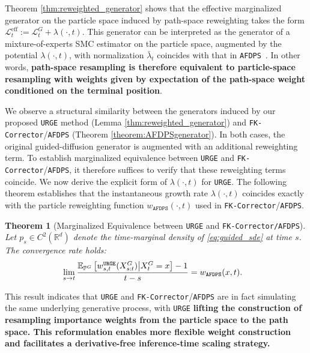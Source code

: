 \documentclass{article}
\theoremstyle{plain}
\newtheorem{theorem}{Theorem}[section]
\theoremstyle{definition}
\theoremstyle{remark}
\renewcommand{\P}{{\mathbb{P}}}
\newcommand{\R}{{\mathbb{R}}}
\begin{document}
Theorem \ref{thm:reweighted_generator} shows that the effective marginalized generator on the particle space induced by path-space reweighting takes the form
\(\mathcal L^{\mathrm{eff}}_t := \mathcal L^G_t + \lambda(\cdot,t).\) This generator can be interpreted as the generator of a mixture-of-experts SMC estimator on the particle space, augmented by the potential $\lambda(\cdot,t)$, with normalization \(\bar\lambda_t\) coincides with that in \texttt{AFDPS}~\cite{chen2025solving}. In other words, \textbf{path-space resampling is therefore equivalent to particle-space resampling with weights given by expectation of the path-space weight conditioned on the terminal position}.
 
We observe a structural similarity between the generators induced by our proposed \texttt{URGE} method (Lemma \ref{thm:reweighted_generator}) and \texttt{FK-Corrector}/\texttt{AFDPS} (Theorem \ref{theorem:AFDPSgenerator}). In both cases, the original guided-diffusion generator is augmented with an additional reweighting term. To establish marginalized equivalence between \texttt{URGE} and \texttt{FK-Corrector}/\texttt{AFDPS}, it therefore suffices to verify that these reweighting terms coincide. We now derive the explicit form of $\lambda(\cdot,t)$ for \texttt{URGE}. 
The following theorem establishes that the instantaneous growth rate $\lambda(\cdot,t)$ coincides exactly with the particle reweighting function $w_{\texttt{AFDPS}}(\cdot,t)$ used in \texttt{FK-Corrector}/\texttt{AFDPS}. 



\begin{theorem}[Marginalized Equivalence between \texttt{URGE} and \texttt{FK-Corrector/AFDPS}]\label{thm:Girsanov_SMC_and_AFDPS}
Let $p_s \in C^2(\R^d)$ denote the time-marginal density of \eqref{eq:guided_sde} at time \(s\). The convergence rate holds:
\begin{equation}
\hspace*{-0.8em}
\lim_{s\rightarrow t}\frac{\mathbb{E}_{\P^G}\left[w^{\texttt{URGE}}_{s,t}(X^G_{s:t}) \big| X_t^G=x\right]-1}{t-s} = w_{\texttt{AFDPS}}(x,t).\label{main_equation_of_same_marginal}
\end{equation}
\end{theorem}

This result indicates that \texttt{URGE} and \texttt{FK-Corrector}/\texttt{AFDPS} are in fact simulating the same underlying generative process, with \texttt{URGE} \textbf{lifting the construction of resampling importance weights from the particle space to the path space. This reformulation enables more flexible weight construction and facilitates a derivative-free inference-time scaling strategy.}
\end{document}
